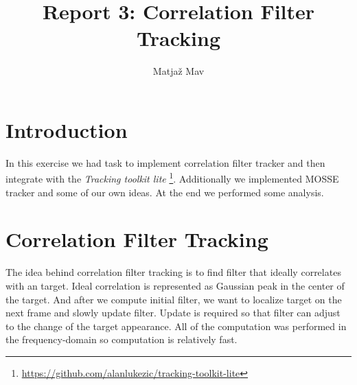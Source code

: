 \documentclass[runningheads]{llncs}
\begin{document}
% 
\title{Report 3: Correlation Filter Tracking}
\author{Matjaž Mav}
%
\maketitle
%
 
\section{Introduction}
In this exercise we had task to implement correlation filter tracker and then integrate with the \textit{Tracking toolkit lite} \footnote{\url{https://github.com/alanlukezic/tracking-toolkit-lite}}. Additionally we implemented MOSSE tracker and some of our own ideas. At the end we performed some analysis.

\section{Correlation Filter Tracking}
The idea behind correlation filter tracking is to find filter that ideally correlates with an target. Ideal correlation is represented as Gaussian peak in the center of the target. And after we compute initial filter, we want to localize target on the next frame and slowly update filter. Update is required so that filter can adjust to the change of the target appearance. All of the computation was performed in the frequency-domain so computation is relatively fast.
\end{document}
